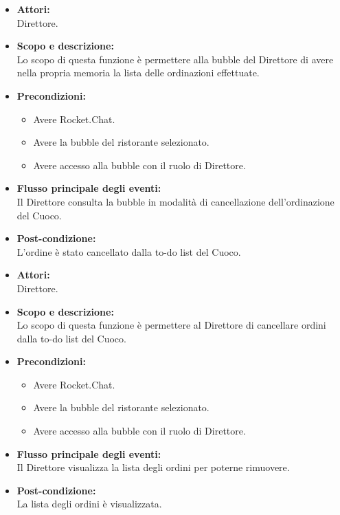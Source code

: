 \begin{itemize}
	\item \textbf{Attori:}
	\\Direttore.
	\item \textbf{Scopo e descrizione:} 
	\\Lo scopo di questa funzione è permettere alla bubble del Direttore di avere nella propria memoria la lista delle ordinazioni effettuate.
	\item \textbf{Precondizioni:}
	\begin{itemize}
		\item Avere Rocket.Chat.
		\item Avere la bubble del ristorante selezionato.
		\item Avere accesso alla bubble con il ruolo di Direttore.
	\end{itemize}
	\item \textbf{Flusso principale degli eventi:}
	\\Il Direttore consulta la bubble in modalità di cancellazione dell'ordinazione del Cuoco.
	\item \textbf{Post-condizione:}
	\\L'ordine è stato cancellato dalla to-do list del Cuoco.
\end{itemize}


\begin{itemize}
	\item \textbf{Attori:}
	\\Direttore.
	\item \textbf{Scopo e descrizione:} 
	\\Lo scopo di questa funzione è permettere al Direttore di cancellare ordini dalla to-do list del Cuoco.
	\item \textbf{Precondizioni:}
	\begin{itemize}
		\item Avere Rocket.Chat.
		\item Avere la bubble del ristorante selezionato.
		\item Avere accesso alla bubble con il ruolo di Direttore.
	\end{itemize}
	\item \textbf{Flusso principale degli eventi:}
	\\Il Direttore visualizza la lista degli ordini per poterne rimuovere.
	\item \textbf{Post-condizione:}
	\\La lista degli ordini è visualizzata.
\end{itemize}

